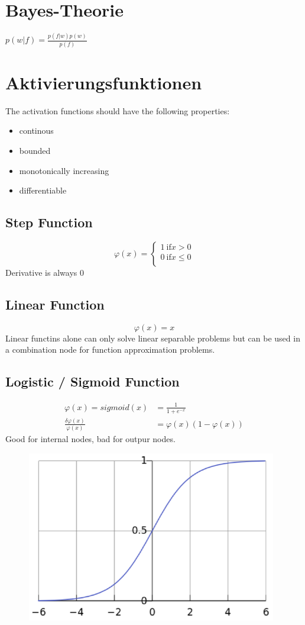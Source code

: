 \documentclass[paper=a4, fontsize=11pt]{scrartcl} %
\begin{document}
\section{Bayes-Theorie}

$p(w|f) = \frac{p(f|w) p(w)}{p(f)}$

\section{Aktivierungsfunktionen}
The activation functions should have the following properties:
\begin{itemize}
	\item continous
	\item bounded
	\item monotonically increasing
	\item differentiable
\end{itemize}
\subsection{Step Function}
\label{ssect:linear-function}
\[
\varphi(x) = \begin{cases}
1 \: \text{if} x > 0 \\
0 \: \text{if} x \leq 0 \\
\end{cases}
\]
Derivative is always 0
\subsection{Linear Function}
\label{ssect:linear-function}
\[
\varphi(x) = x
\]
Linear functins alone can only solve linear separable problems but can be used in a combination node for function approximation problems.
\subsection{Logistic / Sigmoid Function}
\label{ssect:logistic-function}
\begin{align*}
\varphi(x) = sigmoid(x) &= \frac{1}{1 + e^{-x}} \\
\frac{\delta \varphi(x)}{\varphi(x)} &= \varphi(x) (1 - \varphi(x))
\end{align*}
Good for internal nodes, bad for outpur nodes.
\begin{figure}[h]
\includegraphics[scale=0.4]{img/sigmoid}
\end{figure}
\end{document}
